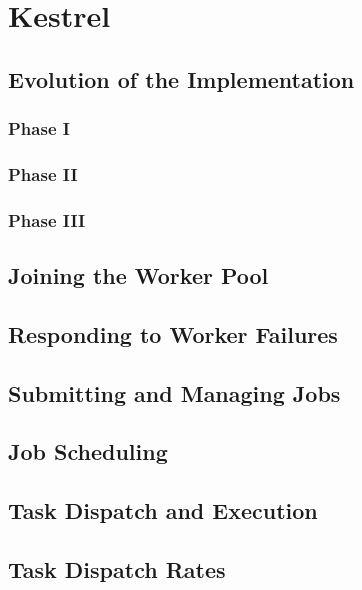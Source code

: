 \chapter{Kestrel}

\section{Evolution of the Implementation}

\subsection{Phase I}

\subsection{Phase II}

\subsection{Phase III}

\section{Joining the Worker Pool}

\section{Responding to Worker Failures}

\section{Submitting and Managing Jobs}

\section{Job Scheduling}

\section{Task Dispatch and Execution}

\section{Task Dispatch Rates}
